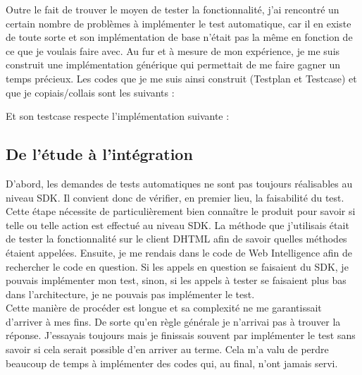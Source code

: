 Outre le fait de trouver le moyen de tester la fonctionnalit\'{e}, j'ai rencontr\'{e} un certain nombre de probl\`{e}mes \`{a} impl\'{e}menter le test automatique, car il en existe de toute sorte et son impl\'{e}mentation de base n'\'{e}tait pas la m\^{e}me en fonction de ce que je voulais faire avec. Au fur et \`{a} mesure de mon exp\'{e}rience, je me suis construit une impl\'{e}mentation g\'{e}n\'{e}rique qui permettait de me faire gagner un temps pr\'{e}cieux. Les codes que je me suis ainsi construit (\gls{Testplan} et \gls{Testcase}) et que je copiais/collais sont les suivants :




Et son testcase respecte l'impl\'{e}mentation suivante :







\subsection{De l'\'{e}tude \`{a} l'int\'{e}gration}

D'abord, les demandes de tests automatiques ne sont pas toujours r\'{e}alisables au niveau SDK. Il convient donc de v\'{e}rifier, en premier lieu, la faisabilit\'{e} du test. Cette \'{e}tape n\'{e}cessite de particuli\`{e}rement bien conna\^{i}tre le produit pour savoir si telle ou telle action est effectu\'{e} au niveau \gls{SDK}. La m\'{e}thode que j'utilisais \'{e}tait de tester la fonctionnalit\'{e} sur le client DHTML afin de savoir quelles m\'{e}thodes \'{e}taient appel\'{e}es. Ensuite, je me rendais dans le code de Web Intelligence afin de rechercher le code en question. Si les appels en question se faisaient du SDK, je pouvais impl\'{e}menter mon test, sinon, si les appels \`{a} tester se faisaient plus bas dans l'architecture, je ne pouvais pas impl\'{e}menter le test.\\
Cette mani\`{e}re de proc\'{e}der est longue et sa complexit\'{e} ne me garantissait d'arriver \`{a} mes fins. De sorte qu'en r\`{e}gle g\'{e}n\'{e}rale je n'arrivai pas \`{a} trouver la r\'{e}ponse. J'essayais toujours mais je finissais souvent par impl\'{e}menter le test sans savoir si cela serait possible d'en arriver au terme. Cela m'a valu de perdre beaucoup de temps \`{a} impl\'{e}menter des codes qui, au final, n'ont jamais servi.\\

